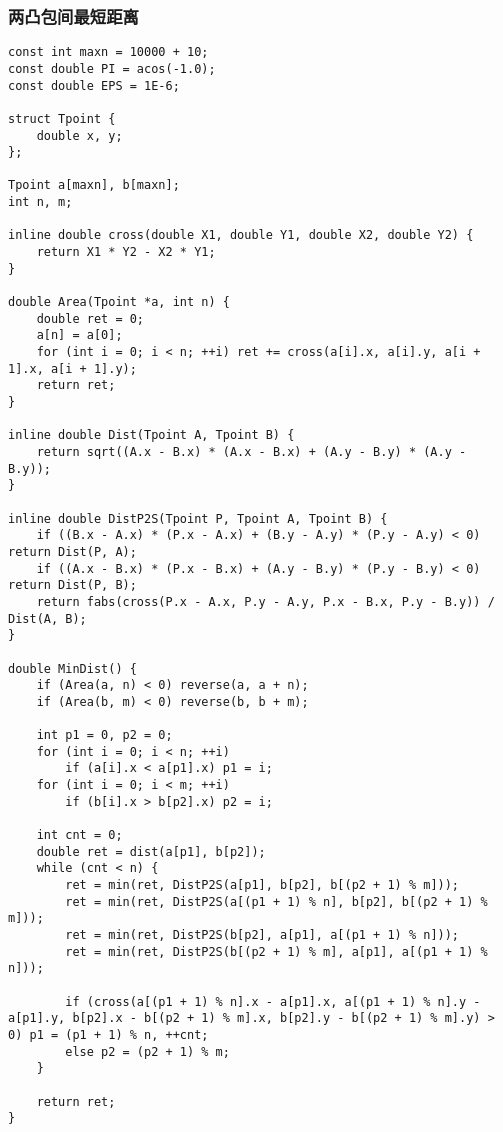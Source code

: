\subsubsection{两凸包间最短距离}
\begin{verbatim}
const int maxn = 10000 + 10;
const double PI = acos(-1.0);
const double EPS = 1E-6;

struct Tpoint {
    double x, y;
};

Tpoint a[maxn], b[maxn];
int n, m;

inline double cross(double X1, double Y1, double X2, double Y2) {
    return X1 * Y2 - X2 * Y1;
}

double Area(Tpoint *a, int n) {
    double ret = 0;
    a[n] = a[0];
    for (int i = 0; i < n; ++i) ret += cross(a[i].x, a[i].y, a[i + 1].x, a[i + 1].y);
    return ret;
}

inline double Dist(Tpoint A, Tpoint B) {
    return sqrt((A.x - B.x) * (A.x - B.x) + (A.y - B.y) * (A.y - B.y));
}

inline double DistP2S(Tpoint P, Tpoint A, Tpoint B) {
    if ((B.x - A.x) * (P.x - A.x) + (B.y - A.y) * (P.y - A.y) < 0) return Dist(P, A);
    if ((A.x - B.x) * (P.x - B.x) + (A.y - B.y) * (P.y - B.y) < 0) return Dist(P, B);
    return fabs(cross(P.x - A.x, P.y - A.y, P.x - B.x, P.y - B.y)) / Dist(A, B);
}

double MinDist() {
    if (Area(a, n) < 0) reverse(a, a + n);
    if (Area(b, m) < 0) reverse(b, b + m);

    int p1 = 0, p2 = 0;
    for (int i = 0; i < n; ++i)
        if (a[i].x < a[p1].x) p1 = i;
    for (int i = 0; i < m; ++i)
        if (b[i].x > b[p2].x) p2 = i;

    int cnt = 0;
    double ret = dist(a[p1], b[p2]);
    while (cnt < n) {
        ret = min(ret, DistP2S(a[p1], b[p2], b[(p2 + 1) % m]));
        ret = min(ret, DistP2S(a[(p1 + 1) % n], b[p2], b[(p2 + 1) % m]));
        ret = min(ret, DistP2S(b[p2], a[p1], a[(p1 + 1) % n]));
        ret = min(ret, DistP2S(b[(p2 + 1) % m], a[p1], a[(p1 + 1) % n]));

        if (cross(a[(p1 + 1) % n].x - a[p1].x, a[(p1 + 1) % n].y - a[p1].y, b[p2].x - b[(p2 + 1) % m].x, b[p2].y - b[(p2 + 1) % m].y) > 0) p1 = (p1 + 1) % n, ++cnt;
        else p2 = (p2 + 1) % m;
    }

    return ret;
}
\end{verbatim}

